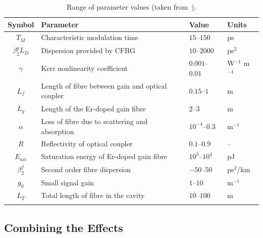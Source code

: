 \documentclass[9pt,twocolumn,twoside]{osajnl}
\newcommand{\Es}{E_{\textrm{sat}}} %
\begin{document}
\begin{table}[tbp]
	\centering
	\caption{Range of parameter values (taken from~\cite{agrawal2013, burgoyne2014, burgoyneemail, tamura1996, usechak2005}).}
 	\label{tab:values}
 	\begin{tabular}{clll}
		\hline\noalign{\smallskip}
		Symbol & Parameter & Value & Units \\
		\hline\noalign{\smallskip}
		$T_M$ & Characteristic modulation time & $15$--$150$ & ps \\
		$\beta_2^g L_D$ & Dispersion provided by CFBG & $10$--$2000$ & ps$^2$ \\
		$\gamma$ & Kerr nonlinearity coefficient & $0.001$--$0.01$ & W$^{-1}$ m$^{-1}$ \\
		$L_f$ & Length of fibre between gain and optical coupler & $0.15$--$1$ & m \\
		$L_g$ & Length of the Er-doped gain fibre & $2$--$3$ & m \\
		$\alpha$ & Loss of fibre due to scattering and absorption & $10^{-4}$--$0.3$ & m$^{-1}$ \\
		$R$ & Reflectivity of optical coupler & $0.1$--$0.9$ & -- \\
		$\Es$ & Saturation energy of Er-doped gain fibre & $10^3$--$10^4$ & pJ \\
		$\beta_2^f$ & Second order fibre dispersion & $-50$--$50$ & ps$^2$/km \\
		$g_0$ & Small signal gain &  $1$--$10$ & m$^{-1}$ \\
		$L_T$ & Total length of fibre in the cavity & $10$--$100$ & m \\
		\noalign{\smallskip}\hline
	\end{tabular}
\end{table}

\subsection{Combining the Effects}
\label{sec:effects}
\end{document}
